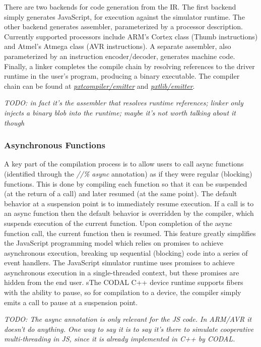 There are two backends for code generation from the IR. The first backend simply generates JavaScript,
for execution against the simulator runtime.  The other backend generates assembler, parameterized by a
processor description.  Currently supported processors include ARM's Cortex class (Thumb instructions)
and Atmel's Atmega class (AVR instructions). A separate assembler, also parameterized by an instruction
encoder/decoder, generates machine code. Finally, a linker completes the compile chain by resolving
references to the driver runtime in the user's program, producing a binary executable. The compiler chain
can be found at \emph{\href{https://github.com/Microsoft/pxt/tree/master/pxtcompiler/emitter}{pxtcompiler/emitter}} and 
\emph{\href{https://github.com/Microsoft/pxt/tree/master/pxtlib/emitter}{pxtlib/emitter}}.

\emph{TODO: in fact it's the assembler that resolves runtime references;
linker only injects a binary blob into the runtime; maybe it's not worth talking about it though}

\subsubsection{Asynchronous Functions}

A key part of the compilation process is to allow users to call async functions (identified through
the \emph{//\% async} annotation) as if they were regular (blocking) functions.  This is done by
compiling each function so that it can be suspended (at the return of a call) and later resumed (at the same point). 
The default behavior at a suspension point is to immediately resume execution.  If a call is to an async function then
the default behavior is overridden by the compiler, which suspends execution of the current function. Upon completion
of the async function call, the current function then is resumed. This feature greatly simplifies the JavaScript
programming model which relies on promises to achieve asynchronous execution, breaking up sequential (blocking) code into
a series of event handlers.  The JavaScript simulator runtime uses promises to achieve asynchronous execution in a
single-threaded context, but these promises are hidden from the end user. sThe CODAL C++ device runtime supports fibers
with the ability to pause, so for compilation to a device, the compiler simply emits a call to pause at a suspension point. 

\emph{TODO: The async annotation is only relevant for the JS code. In ARM/AVR it doesn't do anything.
One way to say it is to say it's there to simulate cooperative multi-threading in JS, since
it is already implemented in C++ by CODAL.}

